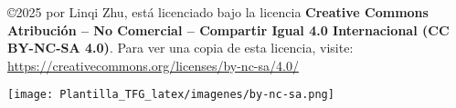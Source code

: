 \thispagestyle{empty}

\textit{\myTitle} ©2025 por Linqi Zhu, está licenciado bajo la licencia \textbf{Creative Commons Atribución – No Comercial – Compartir Igual 4.0 Internacional (CC BY-NC-SA 4.0)}. Para ver una copia de esta licencia, visite:  
\url{https://creativecommons.org/licenses/by-nc-sa/4.0/}
\vspace*{1cm}
\begin{center}
\texttt{[image: Plantilla\_TFG\_latex/imagenes/by-nc-sa.png]}
\end{center}

